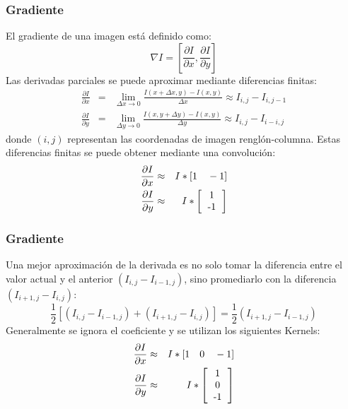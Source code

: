 \begin{frame}\frametitle{Gradiente}
  El gradiente de una imagen está definido como:
  \[\nabla I = \left[\frac{\partial I}{\partial x}, \frac{\partial I}{\partial y}\right]\]
  Las derivadas parciales se puede aproximar mediante diferencias finitas:
  \begin{eqnarray*}
    \frac{\partial I}{\partial x} &=& \lim_{\Delta x \rightarrow 0}\frac{I(x + \Delta x, y) - I(x,y)}{\Delta x}\approx I_{i,j} - I_{i,j-1}\\
    \frac{\partial I}{\partial y} &=& \lim_{\Delta y \rightarrow 0}\frac{I(x, y + \Delta y) - I(x,y)}{\Delta y}\approx I_{i,j} - I_{i-i,j}
  \end{eqnarray*}
  donde $(i,j)$ representan las coordenadas de imagen renglón-columna. Estas diferencias finitas se puede obtener mediante una convolución:
  \begin{eqnarray*}
    \frac{\partial I}{\partial x} &\approx& I * [1\quad -1]\\
    \frac{\partial I}{\partial y} &\approx& I * \left[\begin{tabular}{c}1\\-1\end{tabular}\right]
  \end{eqnarray*}
\end{frame}

\begin{frame}\frametitle{Gradiente}
  Una mejor aproximación de la derivada es no solo tomar la diferencia entre el valor actual y el anterior $(I_{i,j} - I_{i-1,j})$, sino promediarlo con la diferencia $(I_{i+1,j} - I_{i,j})$:
  \[\frac{1}{2}[(I_{i,j} - I_{i-1,j}) + (I_{i+1,j} - I_{i,j})] = \frac{1}{2}(I_{i+1,j} - I_{i-1,j})\]
  Generalmente se ignora el coeficiente y se utilizan los siguientes Kernels:
  \begin{eqnarray*}
    \frac{\partial I}{\partial x} &\approx& I * [1\quad 0\quad -1]\\
    \frac{\partial I}{\partial y} &\approx& I * \left[\begin{tabular}{c}1\\ 0\\-1\end{tabular}\right]
  \end{eqnarray*}
\end{frame}

